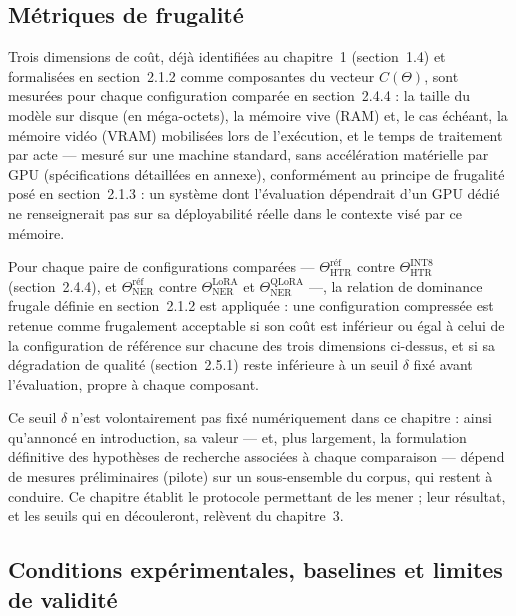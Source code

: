 \subsection{Métriques de frugalité}

Trois dimensions de coût, déjà identifiées au chapitre~1 (section~1.4) et formalisées en section~2.1.2 comme composantes du vecteur $C(\Theta)$, sont mesurées pour chaque configuration comparée en section~2.4.4 : la taille du modèle sur disque (en méga-octets), la mémoire vive (RAM) et, le cas échéant, la mémoire vidéo (VRAM) mobilisées lors de l'exécution, et le temps de traitement par acte --- mesuré sur une machine standard, sans accélération matérielle par GPU (spécifications détaillées en annexe), conformément au principe de frugalité posé en section~2.1.3 : un système dont l'évaluation dépendrait d'un GPU dédié ne renseignerait pas sur sa déployabilité réelle dans le contexte visé par ce mémoire.

Pour chaque paire de configurations comparées --- $\Theta_{\mathrm{HTR}}^{\mathrm{\text{réf}}}$ contre $\Theta_{\mathrm{HTR}}^{\mathrm{INT8}}$ (section~2.4.4), et $\Theta_{\mathrm{NER}}^{\mathrm{\text{réf}}}$ contre $\Theta_{\mathrm{NER}}^{\mathrm{LoRA}}$ et $\Theta_{\mathrm{NER}}^{\mathrm{QLoRA}}$ ---, la relation de dominance frugale définie en section~2.1.2 est appliquée : une configuration compressée est retenue comme frugalement acceptable si son coût est inférieur ou égal à celui de la configuration de référence sur chacune des trois dimensions ci-dessus, et si sa dégradation de qualité (section~2.5.1) reste inférieure à un seuil $\delta$ fixé avant l'évaluation, propre à chaque composant.

Ce seuil $\delta$ n'est volontairement pas fixé numériquement dans ce chapitre : ainsi qu'annoncé en introduction, sa valeur --- et, plus largement, la formulation définitive des hypothèses de recherche associées à chaque comparaison --- dépend de mesures préliminaires (pilote) sur un sous-ensemble du corpus, qui restent à conduire.
Ce chapitre établit le protocole permettant de les mener ; leur résultat, et les seuils qui en découleront, relèvent du chapitre~3.

\subsection{Conditions expérimentales, baselines et limites de validité}

